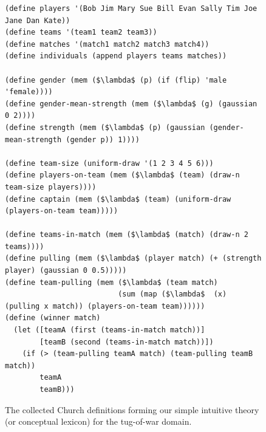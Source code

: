 \documentclass[pdfextras]{handbook}
\begin{document}
 \begin{figure}[htbp]
\begin{center}
 \begin{lstlisting}[mathescape]
(define players '(Bob Jim Mary Sue Bill Evan Sally Tim Joe Jane Dan Kate))
(define teams '(team1 team2 team3))
(define matches '(match1 match2 match3 match4))
(define individuals (append players teams matches))

(define gender (mem ($\lambda$ (p) (if (flip) 'male 'female))))
(define gender-mean-strength (mem ($\lambda$ (g) (gaussian 0 2))))
(define strength (mem ($\lambda$ (p) (gaussian (gender-mean-strength (gender p)) 1))))

(define team-size (uniform-draw '(1 2 3 4 5 6)))
(define players-on-team (mem ($\lambda$ (team) (draw-n team-size players))))
(define captain (mem ($\lambda$ (team) (uniform-draw (players-on-team team)))))

(define teams-in-match (mem ($\lambda$ (match) (draw-n 2 teams))))
(define pulling (mem ($\lambda$ (player match) (+ (strength player) (gaussian 0 0.5)))))
(define team-pulling (mem ($\lambda$ (team match) 
                          (sum (map ($\lambda$  (x) (pulling x match)) (players-on-team team))))))
(define (winner match) 
  (let ([teamA (first (teams-in-match match))]
        [teamB (second (teams-in-match match))])
    (if (> (team-pulling teamA match) (team-pulling teamB match))
        teamA
        teamB)))
\end{lstlisting}

\caption{The collected Church definitions forming our simple intuitive theory (or conceptual lexicon) for the tug-of-war domain.}
\label{tow}
\end{center}
\end{figure}
\end{document}
